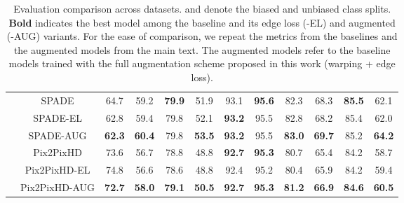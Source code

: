 \documentclass[final]{cvpr}
\newcommand\+{\mkern4mu}
\begin{document}
\begin{table*}[h]
{\begin{tabular}{@{}lc@{\hspace{0.3cm}}c@{\hspace{0.7cm}}ccc@{\hspace{0.7cm}}ccc@{\hspace{0.7cm}}ccc@{}}
			& \small SPADE & \small 64.7 & \small 59.2 & \small \textbf{79.9} & \small 51.9 & \small 93.1 & \small \textbf{95.6} & \small 82.3 & \small 68.3 & \small \textbf{85.5} & \small 62.1 \tabularnewline
			& \small SPADE-EL & \small 62.8 & \small 59.4 & \small 79.8 & \small 52.1 & \small \textbf{93.2} & \small 95.5 & \small 82.8 & \small 68.2 & \small 85.4 & \small 62.0 \tabularnewline
			& \small SPADE-AUG & \small \textbf{62.3} & \small \textbf{60.4} & \small 79.8 & \small \textbf{53.5} & \small \textbf{93.2} & \small 95.5 & \small \textbf{83.0} & \small \textbf{69.7} & \small 85.2 & \small \textbf{64.2} \tabularnewline[0.2cm] 
			
			& \small Pix2PixHD & \small 73.6& \small 56.7& \small 78.8& \small 48.8 & \small \textbf{92.7} & \small \textbf{95.3} & \small 80.7 & \small 65.4 & \small 84.2 & \small 58.7 \tabularnewline
			& \small Pix2PixHD-EL & \small 74.8 & \small 56.6 & \small 78.6 & \small 48.8 & \small 92.4 & \small 95.2 & \small 80.4 & \small 65.9 & \small 84.2 & \small 59.4 \tabularnewline	
			& \small Pix2PixHD-AUG & \small \textbf{72.7} & \small \textbf{58.0} & \small \textbf{79.1} & \small \textbf{50.5} & \small \textbf{92.7} & \small \textbf{95.3} & \small \textbf{81.2} & \small \textbf{66.9} & \small \textbf{84.6} & \small \textbf{60.5} \tabularnewline 
		\end{tabular}}
		\vspace{0.5em}
		\caption{Evaluation comparison across datasets.  and  denote the biased and unbiased class splits. \textbf{Bold} indicates the best model among the baseline and its edge loss (-EL) and augmented (-AUG) variants. For the ease of comparison, we repeat the metrics from the baselines and the augmented models from the main text. The augmented models refer to the baseline models trained with the full augmentation scheme proposed in this work (warping + edge loss).}
		\label{tab:aug_full}
\end{table*}
 
\end{document}
